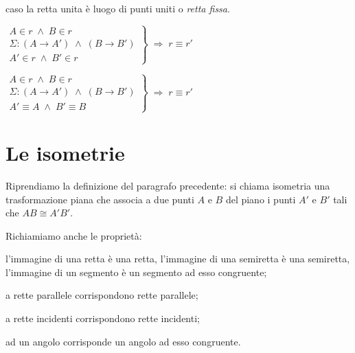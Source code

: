 caso la retta unita è luogo di punti uniti o \emph{retta fissa}.

\noindent\begin{minipage}{0.6\textwidth}\parindent15pt
\noindent \(\left.\begin{array}{lll} A\in r \;\wedge\; B\in r\\ \Sigma 
: (A\rightarrow A') \;\wedge\; (B\rightarrow B')\\ A'\in r \;\wedge\; 
B'\in r \end{array}\right\} \;\Rightarrow\; r\equiv r'\)
\end{minipage}\hfil
\begin{minipage}{0.4\textwidth}
	\centering
\end{minipage}\vspace{8pt}

\noindent\begin{minipage}{0.6\textwidth}\parindent15pt
\noindent \(\left.\begin{array}{lll} A\in r \;\wedge\; B\in r\\ \Sigma 
: (A\rightarrow A') \;\wedge\; (B\rightarrow B')\\ A'\equiv A 
\;\wedge\; B'\equiv B \end{array}\right\} \;\Rightarrow\; r\equiv r'\)
\end{minipage}\hfil
\begin{minipage}{0.4\textwidth}
	\centering
\end{minipage}


\section{Le isometrie}\label{sect:isometrie}

Riprendiamo la definizione del paragrafo precedente: si chiama 
isometria una trasformazione piana che associa a due punti \(A\) e \(B\) 
del piano i punti \(A'\) e \(B'\) tali che \(AB\cong A'B'\).

Richiamiamo anche le proprietà:
\begin{itemize*}
\item l'immagine di una retta è una retta, l'immagine di una 
semiretta è una semiretta, l'immagine di un segmento è un segmento ad 
esso congruente;
\item a rette parallele corrispondono rette parallele;
\item a rette incidenti corrispondono rette incidenti;
\item ad un angolo corrisponde un angolo ad esso congruente.
\end{itemize*}

